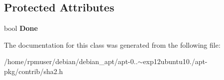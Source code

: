 \subsection*{\-Protected \-Attributes}
\begin{DoxyCompactItemize}
\item 
bool {\bfseries \-Done}\label{classSHA2SummationBase_ac3fdeca3b63101bb46822fca80eacc18}

\end{DoxyCompactItemize}


\-The documentation for this class was generated from the following file\-:\begin{DoxyCompactItemize}
\item 
/home/rpmuser/debian/debian\-\_\-apt/apt-\/0..$\sim$exp12ubuntu10./apt-\/pkg/contrib/sha2.\-h\end{DoxyCompactItemize}
